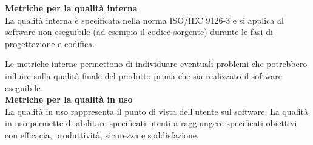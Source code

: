 		\textbf{Metriche per la qualità interna}\\
		
			La qualità interna è specificata nella norma ISO/IEC 9126-3 e si applica al software non eseguibile (ad esempio il codice sorgente) durante le fasi di progettazione e codifica. 

			Le metriche interne permettono di individuare eventuali problemi che potrebbero influire sulla qualità finale del prodotto prima che sia realizzato il software eseguibile.\\

		\textbf{Metriche per la qualità in uso}\\
		
			La qualità in uso rappresenta il punto di vista dell'utente sul software. La qualità in uso permette di abilitare specificati utenti a raggiungere specificati obiettivi con efficacia, produttività, sicurezza e soddisfazione.


		
			
			
		
